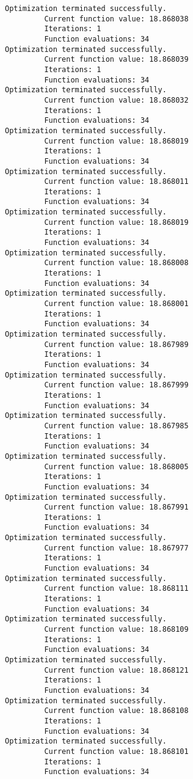 \documentclass[11pt]{article}
\begin{document}
\begin{Verbatim}[commandchars=\\\{\}]
Optimization terminated successfully.
         Current function value: 18.868038
         Iterations: 1
         Function evaluations: 34
Optimization terminated successfully.
         Current function value: 18.868039
         Iterations: 1
         Function evaluations: 34
Optimization terminated successfully.
         Current function value: 18.868032
         Iterations: 1
         Function evaluations: 34
Optimization terminated successfully.
         Current function value: 18.868019
         Iterations: 1
         Function evaluations: 34
Optimization terminated successfully.
         Current function value: 18.868011
         Iterations: 1
         Function evaluations: 34
Optimization terminated successfully.
         Current function value: 18.868019
         Iterations: 1
         Function evaluations: 34
Optimization terminated successfully.
         Current function value: 18.868008
         Iterations: 1
         Function evaluations: 34
Optimization terminated successfully.
         Current function value: 18.868001
         Iterations: 1
         Function evaluations: 34
Optimization terminated successfully.
         Current function value: 18.867989
         Iterations: 1
         Function evaluations: 34
Optimization terminated successfully.
         Current function value: 18.867999
         Iterations: 1
         Function evaluations: 34
Optimization terminated successfully.
         Current function value: 18.867985
         Iterations: 1
         Function evaluations: 34
Optimization terminated successfully.
         Current function value: 18.868005
         Iterations: 1
         Function evaluations: 34
Optimization terminated successfully.
         Current function value: 18.867991
         Iterations: 1
         Function evaluations: 34
Optimization terminated successfully.
         Current function value: 18.867977
         Iterations: 1
         Function evaluations: 34
Optimization terminated successfully.
         Current function value: 18.868111
         Iterations: 1
         Function evaluations: 34
Optimization terminated successfully.
         Current function value: 18.868109
         Iterations: 1
         Function evaluations: 34
Optimization terminated successfully.
         Current function value: 18.868121
         Iterations: 1
         Function evaluations: 34
Optimization terminated successfully.
         Current function value: 18.868108
         Iterations: 1
         Function evaluations: 34
Optimization terminated successfully.
         Current function value: 18.868101
         Iterations: 1
         Function evaluations: 34

\end{Verbatim}
\end{document}
